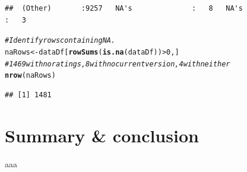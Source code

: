 \documentclass[12pt]{report}\usepackage[]{graphicx}\usepackage[]{xcolor}
\makeatletter
\newcommand{\hlnum}[1]{\textcolor[rgb]{0.686,0.059,0.569}{#1}}%
\newcommand{\hlcom}[1]{\textcolor[rgb]{0.678,0.584,0.686}{\textit{#1}}}%
\newcommand{\hlopt}[1]{\textcolor[rgb]{0,0,0}{#1}}%
\newcommand{\hlstd}[1]{\textcolor[rgb]{0.345,0.345,0.345}{#1}}%
\newcommand{\hlkwb}[1]{\textcolor[rgb]{0.69,0.353,0.396}{#1}}%
\newcommand{\hlkwd}[1]{\textcolor[rgb]{0.737,0.353,0.396}{\textbf{#1}}}%
\newenvironment{kframe}{%
 \def\at@end@of@kframe{}%
 \ifinner\ifhmode%
  \def\at@end@of@kframe{\end{minipage}}%
  \begin{minipage}{\columnwidth}%
 \fi\fi%
 \def\FrameCommand##1{\hskip\@totalleftmargin \hskip-\fboxsep
 \colorbox{shadecolor}{##1}\hskip-\fboxsep
     \hskip-\linewidth \hskip-\@totalleftmargin \hskip\columnwidth}%
 \MakeFramed {\advance\hsize-\width
   \@totalleftmargin\z@ \linewidth\hsize
   \@setminipage}}%
 {\par\unskip\endMakeFramed%
 \at@end@of@kframe}
\newenvironment{knitrout}{}{} %
\makeatother
\begin{document}
\begin{knitrout}
\begin{kframe}
\begin{verbatim}
##  (Other)       :9257   NA's              :   8   NA's              :   3
\end{verbatim}
\begin{alltt}
\hlcom{# Identify rows containing NA.}
\hlstd{naRows} \hlkwb{<-} \hlstd{dataDf[}\hlkwd{rowSums}\hlstd{(}\hlkwd{is.na}\hlstd{(dataDf))} \hlopt{>} \hlnum{0}\hlstd{,]}
\hlcom{# 1469 with no ratings, 8 with no current version, 4 with neither}
\hlkwd{nrow}\hlstd{(naRows)}
\end{alltt}
\begin{verbatim}
## [1] 1481
\end{verbatim}
\end{kframe}
\end{knitrout}

    \chapter*{Summary \& conclusion}\label{ch:sec3}

    aaa
\end{document}
